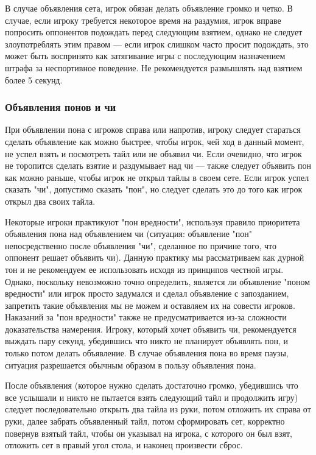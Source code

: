 В случае объявления сета, игрок обязан делать объявление громко и четко. В случае, если игроку требуется некоторое время на раздумия, игрок вправе попросить оппонентов подождать перед следующим взятием, однако не следует злоупотреблять этим правом --- если игрок слишком часто просит подождать, это может быть воспринято как затягивание игры с последующим назначением штрафа за неспортивное поведение. Не рекомендуется размышлять над взятием более 5 секунд.

\subsubsection{Объявления понов и чи}

При объявлении пона с игроков справа или напротив, игроку следует стараться сделать объявление как можно быстрее, чтобы игрок, чей ход в данный момент, не успел взять и посмотреть тайл или не объявил чи. Если очевидно, что игрок не торопится сделать взятие и раздумывает над чи --- также следует объявить пон как можно раньше, чтобы игрок не открыл тайлы в своем сете. Если игрок успел сказать "чи", допустимо сказать "пон", но следует сделать это до того как игрок открыл два своих тайла. 

Некоторые игроки практикуют "пон вредности", используя правило приоритета объявления пона над объявлением чи (ситуация: объявление "пон" непосредственно после объявления "чи", сделанное по причине того, что оппонент решает объявить чи). Данную практику мы рассматриваем как дурной тон и не рекомендуем ее использовать исходя из принципов честной игры. Однако, поскольку невозможно точно определить, является ли объявление "поном вредности" или игрок просто задумался и сделал объявление с запозданием, запретить такие объявления мы не можем и оставляем их на совести игроков. Наказаний за "пон вредности" также не предусматривается из-за сложности доказательства намерения. Игроку, который хочет объявить чи, рекомендуется выждать пару секунд, убедившись что никто не планирует объявлять пон, и только потом делать объявление. В случае объявления пона во время паузы, ситуация разрешается обычным образом в пользу объявления пона.

После объявления (которое нужно сделать достаточно громко, убедившись что все услышали и никто не пытается взять следующий тайл и продолжить игру) следует последовательно открыть два тайла из руки, потом отложить их справа от руки, далее забрать объявленный тайл, потом сформировать сет, корректно повернув взятый тайл, чтобы он указывал на игрока, с которого он был взят, отложить сет в правый угол стола, и наконец произвести сброс.

